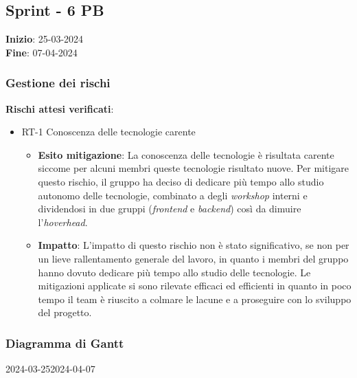 \subsection{Sprint - 6 PB}
\textbf{Inizio}: 25-03-2024 \\
\textbf{Fine}: 07-04-2024

\subsubsection{Gestione dei rischi}
\textbf{Rischi attesi verificati}:

\begin{itemize}
	\item RT-1 Conoscenza delle tecnologie carente
	      \begin{itemize}
		      \item \textbf{Esito mitigazione}: La conoscenza delle tecnologie
		            è risultata carente siccome per alcuni membri queste tecnologie risultato nuove. 
					Per mitigare questo rischio, il gruppo ha deciso di dedicare più tempo allo studio autonomo delle tecnologie, combinato a degli 
					\textit{workshop} interni e dividendosi in due gruppi (\textit{frontend} e \textit{backend}) così da dimuire l'\textit{hoverhead}.

		      \item \textbf{Impatto}: L'impatto di questo rischio non è stato significativo, se non per un lieve rallentamento generale del lavoro, 
			  in quanto i membri del gruppo hanno dovuto dedicare più tempo allo studio delle tecnologie. Le mitigazioni applicate si sono rilevate efficaci ed efficienti in 
			  quanto in poco tempo il team è riuscito a colmare le lacune e a proseguire con lo sviluppo del progetto.
	      \end{itemize}
\end{itemize}

\subsubsection{Diagramma di Gantt}

\begin{ganttchart}[
		x unit=0.6cm, %
		y unit chart=0.6cm,
		bar/.style={fill=blue!50},
		bar height=0.5,
		time slot format=isodate,
		time slot unit=day,
		vgrid,
		today=2024-03-26,
		today rule/.style={draw=red, ultra thick}
	]{2024-03-25}{2024-04-07}
	 \\
	 \\
	 \\
	 \\
	 \\
\end{ganttchart}

